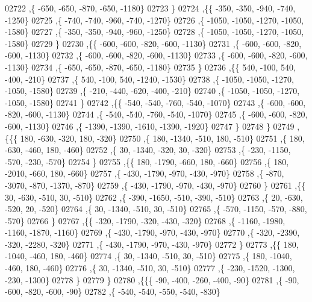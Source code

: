 \begin{DoxyCode}
02722     ,\{  -650,  -650,  -870,  -650, -1180\}
02723     \}
02724    ,\{\{  -350,  -350,  -940,  -740, -1250\}
02725     ,\{  -740,  -740,  -960,  -740, -1270\}
02726     ,\{ -1050, -1050, -1270, -1050, -1580\}
02727     ,\{  -350,  -350,  -940,  -960, -1250\}
02728     ,\{ -1050, -1050, -1270, -1050, -1580\}
02729     \}
02730    ,\{\{  -600,  -600,  -820,  -600, -1130\}
02731     ,\{  -600,  -600,  -820,  -600, -1130\}
02732     ,\{  -600,  -600,  -820,  -600, -1130\}
02733     ,\{  -600,  -600,  -820,  -600, -1130\}
02734     ,\{  -650,  -650,  -870,  -650, -1180\}
02735     \}
02736    ,\{\{   540,  -100,   540,  -400,  -210\}
02737     ,\{   540,  -100,   540, -1240, -1530\}
02738     ,\{ -1050, -1050, -1270, -1050, -1580\}
02739     ,\{  -210,  -440,  -620,  -400,  -210\}
02740     ,\{ -1050, -1050, -1270, -1050, -1580\}
02741     \}
02742    ,\{\{  -540,  -540,  -760,  -540, -1070\}
02743     ,\{  -600,  -600,  -820,  -600, -1130\}
02744     ,\{  -540,  -540,  -760,  -540, -1070\}
02745     ,\{  -600,  -600,  -820,  -600, -1130\}
02746     ,\{ -1390, -1390, -1610, -1390, -1920\}
02747     \}
02748    \}
02749   ,\{\{\{   180,  -630,  -320,   180,  -320\}
02750     ,\{   180, -1340,  -510,   180,  -510\}
02751     ,\{   180,  -630,  -460,   180,  -460\}
02752     ,\{    30, -1340,  -320,    30,  -320\}
02753     ,\{  -230, -1150,  -570,  -230,  -570\}
02754     \}
02755    ,\{\{   180, -1790,  -660,   180,  -660\}
02756     ,\{   180, -2010,  -660,   180,  -660\}
02757     ,\{  -430, -1790,  -970,  -430,  -970\}
02758     ,\{  -870, -3070,  -870, -1370,  -870\}
02759     ,\{  -430, -1790,  -970,  -430,  -970\}
02760     \}
02761    ,\{\{    30,  -630,  -510,    30,  -510\}
02762     ,\{  -390, -1650,  -510,  -390,  -510\}
02763     ,\{    20,  -630,  -520,    20,  -520\}
02764     ,\{    30, -1340,  -510,    30,  -510\}
02765     ,\{  -570, -1150,  -570,  -880,  -570\}
02766     \}
02767    ,\{\{  -320, -1790,  -320,  -430,  -320\}
02768     ,\{ -1160, -1980, -1160, -1870, -1160\}
02769     ,\{  -430, -1790,  -970,  -430,  -970\}
02770     ,\{  -320, -2390,  -320, -2280,  -320\}
02771     ,\{  -430, -1790,  -970,  -430,  -970\}
02772     \}
02773    ,\{\{   180, -1040,  -460,   180,  -460\}
02774     ,\{    30, -1340,  -510,    30,  -510\}
02775     ,\{   180, -1040,  -460,   180,  -460\}
02776     ,\{    30, -1340,  -510,    30,  -510\}
02777     ,\{  -230, -1520, -1300,  -230, -1300\}
02778     \}
02779    \}
02780   ,\{\{\{   -90,  -400,  -260,  -400,   -90\}
02781     ,\{   -90,  -600,  -820,  -600,   -90\}
02782     ,\{  -540,  -540,  -550,  -540,  -830\}

\end{DoxyCode}
